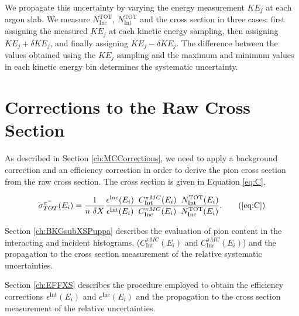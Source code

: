 We propagate this uncertainty  by varying the energy measurement $KE_{j}$ at each argon slab. We measure $N^{\text{TOT}}_{\text{Inc}}$,  $N^{\text{TOT}}_{\text{Int}}$ and the cross section  in three cases: first assigning the measured $KE_{j}$ at each kinetic energy sampling, then assigning $KE_{j} + \delta KE_{j}$, and finally assigning $KE_{j} - \delta KE_{j}$. The difference between the values obtained using the $KE_{j}$ sampling and the maximum and minimum values in each kinetic energy bin determines the systematic uncertainty.


\section{Corrections to the Raw Cross Section}\label{ch:PionXSCorrections}
As described in Section \ref{ch:MCCorrections}, we need to apply a background correction and an efficiency correction in order to derive the pion cross section from the raw cross section.  The  cross section is given in Equation \ref{eq:C}, 

\begin{equation}
   \sigma^{\pi^-}_{TOT}(E_{i})  = \frac{1}{n \text{ } \delta X}\frac{ \epsilon^{\text{Inc}}(E_i)  \hspace{0.2cm} C^{\pi MC}_{\text{Int}} (E_{i}) \hspace{0.2cm} N^{\text{TOT}}_{\text{Int}} (E_{i}) }{   \epsilon^{\text{Int}}(E_i) \hspace{0.2cm} C^{\pi MC}_{\text{Inc}} (E_{i}) \hspace{0.2cm}  N^{\text{TOT}}_{\text{Inc}} (E_{i})}.
 \tag{\ref{eq:C}}
\end{equation}

Section \ref{ch:BKGsubXSPuppa} describes the evaluation of pion content in the interacting and incident histograms, ($C^{\pi MC}_{\text{Int}} (E_{i})$  and  $C^{\pi MC}_{\text{Inc}} (E_{i})$) and the propagation to the cross section measurement of the relative systematic uncertainties.

Section \ref{ch:EFFXS} describes the procedure employed to obtain  the efficiency corrections $\epsilon^{\text{Int}}(E_i)$  and $\epsilon^{\text{Inc}}(E_i)$ and the propagation to the cross section measurement of the relative uncertainties.


